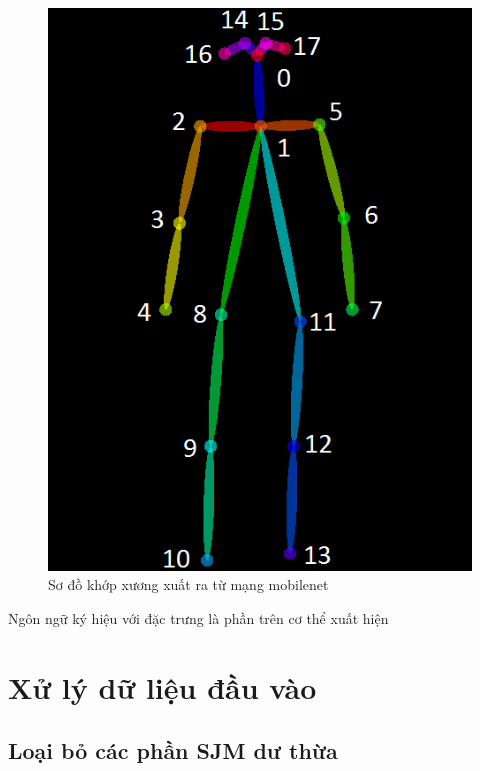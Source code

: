 \FloatBarrier
\begin{figure}[htp]
\begin{center}
\includegraphics[scale=0.6]{chap4/c4_figs/joints_order.png}
\end{center}
\caption{Sơ đồ khớp xương xuất ra từ mạng mobilenet}
\label{fig:joints}
\end{figure}
\FloatBarrier

Ngôn ngữ ký hiệu với đặc trưng là phần trên cơ thể xuất hiện 
\section{Xử lý dữ liệu đầu vào}
\subsection{Loại bỏ các phần SJM dư thừa}

